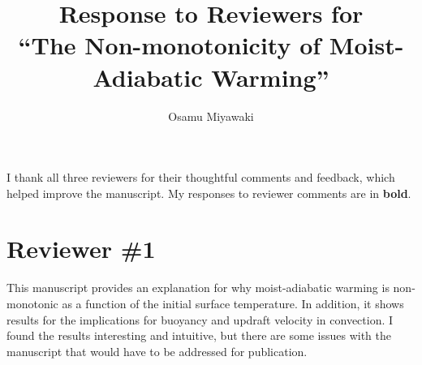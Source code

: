 \documentclass{article}
\title{Response to Reviewers for\\``The Non-monotonicity of Moist-Adiabatic Warming''}
\author{Osamu Miyawaki}
\begin{document}
\maketitle

I thank all three reviewers for their thoughtful comments and feedback, which helped improve the manuscript. My responses to reviewer comments are in \textbf{bold}.

\section*{Reviewer \#1}

This manuscript provides an explanation for why moist-adiabatic warming is non-monotonic as a function of the initial surface temperature. In addition, it shows results for the implications for buoyancy and updraft velocity in convection. I found the results interesting and intuitive, but there are some issues with the manuscript that would have to be addressed for publication.
\end{document}
